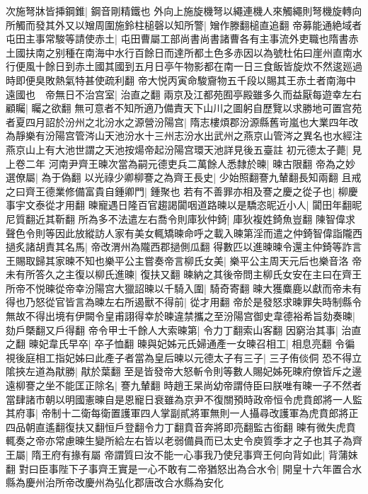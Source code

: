 次施弩牀皆挿鋼錐|{
	鋼音剛精鐵也}
外向上施旋機弩以繩連機人來觸繩則弩機旋轉向所觸而發其外又以矰周圍施鈴柱槌磬以知所警|{
	矰作滕翻槌直追翻}
帝募能通絶域者屯田主事常駿等請使赤土|{
	屯田曹屬工部尚書尚書諸曹各有主事流外吏職也隋書赤土國扶南之别種在南海中水行百餘日而達所都土色多赤因以為號杜佑曰崖州直南水行便風十餘日到赤土國其國到五月日亭午物影都在南一日三食飯皆旋炊不然逡廵過時即便臭敗熱氣特甚使疏利翻}
帝大悦丙寅命駿齎物五千段以賜其王赤土者南海中遠國也　帝無日不治宫室|{
	治直之翻}
兩京及江都苑囿亭殿雖多久而益厭每遊幸左右顧矚|{
	矚之欲翻}
無可意者不知所適乃備責天下山川之圖躬自歷覽以求勝地可置宫苑者夏四月詔於汾州之北汾水之源營汾陽宫|{
	隋志樓煩郡汾源縣舊岢嵐也大業四年改為靜樂有汾陽宫管涔山天池汾水十三州志汾水出武州之燕京山管涔之異名也水經注燕京山上有大池世謂之天池按煬帝起汾陽宫環天池詳見後五臺註}
初元德太子薨|{
	見上卷二年}
河南尹齊王暕次當為嗣元德吏兵二萬餘人悉隸於暕|{
	暕古限翻}
帝為之妙選僚屬|{
	為于偽翻}
以光祿少卿柳謇之為齊王長史|{
	少始照翻謇九輦翻長知兩翻}
且戒之曰齊王德業修備富貴自鍾卿門|{
	鍾聚也}
若有不善罪亦相及謇之慶之從子也|{
	柳慶事宇文泰從才用翻}
暕寵遇日隆百官趨謁闐咽道路暕以是驕恣昵近小人|{
	闐田年翻昵尼質翻近其靳翻}
所為多不法遣左右喬令則庫狄仲錡|{
	庫狄複姓錡魚豈翻}
陳智偉求聲色令則等因此放縱訪人家有美女輒矯暕命呼之載入暕第淫而遣之仲錡智偉詣隴西撾炙諸胡責其名馬|{
	帝改渭州為隴西郡撾側瓜翻}
得數匹以進暕暕令還主仲錡等詐言王賜取歸其家暕不知也樂平公主嘗奏帝言柳氏女美|{
	樂平公主周天元后也樂音洛}
帝未有所答久之主復以柳氏進暕|{
	復扶又翻}
暕納之其後帝問主柳氏女安在主曰在齊王所帝不悦暕從帝幸汾陽宫大獵詔暕以千騎入圍|{
	騎奇寄翻}
暕大獲麋鹿以獻而帝未有得也乃怒從官皆言為暕左右所遏獸不得前|{
	從才用翻}
帝於是發怒求暕罪失時制縣令無故不得出境有伊闕令皇甫詡得幸於暕違禁攜之至汾陽宫御史韋德裕希旨劾奏暕|{
	劾戶槩翻又戶得翻}
帝令甲士千餘人大索暕第|{
	令力丁翻索山客翻}
因窮治其事|{
	治直之翻}
暕妃韋氏早卒|{
	卒子恤翻}
暕與妃姊元氏婦通產一女暕召相工|{
	相息亮翻}
令徧視後庭相工指妃姊曰此產子者當為皇后暕以元德太子有三子|{
	三子侑倓侗}
恐不得立隂挾左道為猒勝|{
	猒於葉翻}
至是皆發帝大怒斬令則等數人賜妃姊死暕府僚皆斥之邊遠柳謇之坐不能匡正除名|{
	謇九輦翻}
時趙王杲尚幼帝謂侍臣曰朕唯有暕一子不然者當肆諸市朝以明國憲暕自是恩寵日衰雖為京尹不復關預時政帝恒令虎賁郎將一人監其府事|{
	帝制十二衛每衛置護軍四人掌副貳將軍無則一人攝尋改護軍為虎賁郎將正四品朝直遙翻復扶又翻恒戶登翻令力丁翻賁音奔將即亮翻監古銜翻}
暕有微失虎賁輒奏之帝亦常慮暕生變所給左右皆以老弱備員而已太史令庾質季才之子也其子為齊王屬|{
	隋王府有掾有屬}
帝謂質曰汝不能一心事我乃使兒事齊王何向背如此|{
	背蒲妹翻}
對曰臣事陛下子事齊王實是一心不敢有二帝猶怒出為合水令|{
	開皇十六年置合水縣為慶州治所帝改慶州為弘化郡唐改合水縣為安化}
